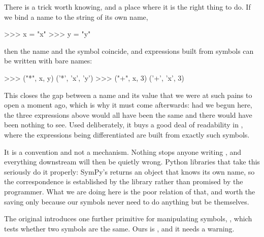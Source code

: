 \noindent
\begin{notTaste}
There is a trick worth knowing, and a place where it is the right thing to do.
If we bind a name to the string of its own name,

\begin{codeBlock}
>>> x = "x"
>>> y = "y"
\end{codeBlock}

\noindent
then the name and the symbol coincide, and expressions built from symbols can
be written with bare names:

\begin{codeBlock}
>>> ("*", x, y)
('*', 'x', 'y')
>>> ("+", x, 3)
('+', 'x', 3)
\end{codeBlock}

\noindent
This closes the gap between a name and its value that we were at such pains to
open a moment ago, which is why it must come afterwards: had we begun here, the
three expressions above would all have been the same and there would have been
nothing to see.  Used deliberately, it buys a good deal of readability in
, where the expressions being differentiated are built from
exactly such symbols.

It is a convention and not a mechanism.  Nothing stops anyone writing , and everything downstream will then be quietly wrong.  Python libraries
that take this seriously do it properly: SymPy's  returns an
object that knows its own name, so the correspondence is established by the
library rather than promised by the programmer.  What we are doing here is the
poor relation of that, and worth the saving only because our symbols never need
to do anything but be themselves.
\end{notTaste}

The original introduces one further primitive for manipulating symbols,
, which tests whether two symbols are the same.  Ours is \code{==},
and it needs a warning.

